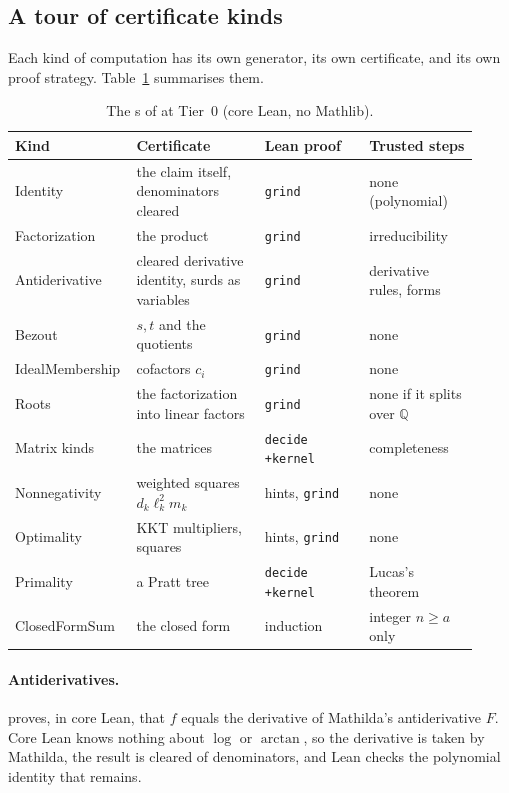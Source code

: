 \subsection{A tour of certificate kinds}
\label{ssec:cert-kinds}

Each kind of computation has its own generator, its own certificate, and its own
proof strategy. Table~\ref{tab:cert-kinds} summarises them.

\begin{table}[ht]
\centering\small
\begin{tabular}{@{}p{0.20\linewidth}p{0.27\linewidth}p{0.22\linewidth}p{0.23\linewidth}@{}}
\toprule
Kind & Certificate & Lean proof & Trusted steps \\
\midrule
Identity & the claim itself, denominators cleared & \texttt{grind} & none (polynomial) \\
Factorization & the product & \texttt{grind} & irreducibility \\
Antiderivative & cleared derivative identity, surds as variables & \texttt{grind} & derivative rules, \B{Together} forms \\
Bezout & \(s,t\) and the quotients & \texttt{grind} & none \\
IdealMembership & cofactors \(c_i\) & \texttt{grind} & none \\
Roots & the factorization into linear factors & \texttt{grind} & none if it splits over \(\mathbb{Q}\) \\
Matrix kinds & the matrices & \texttt{decide +kernel} & \B{NullSpace} completeness \\
Nonnegativity & weighted squares \(d_k\ell_k^2 m_k\) & hints, \texttt{grind} & none \\
Optimality & KKT multipliers, squares & hints, \texttt{grind} & none \\
Primality & a Pratt tree & \texttt{decide +kernel} & Lucas's theorem \\
ClosedFormSum & the closed form & induction & integer \(n\ge a\) only \\
\bottomrule
\end{tabular}
\caption{The s of  at Tier~0 (core Lean, no Mathlib).}
\label{tab:cert-kinds}
\end{table}

\paragraph{Antiderivatives.}  proves, in core Lean,
that \(f\) equals the derivative of Mathilda's antiderivative \(F\). Core Lean knows
nothing about \(\log\) or \(\arctan\), so the derivative is taken by Mathilda, the
result is cleared of denominators, and Lean checks the polynomial identity that
remains.

